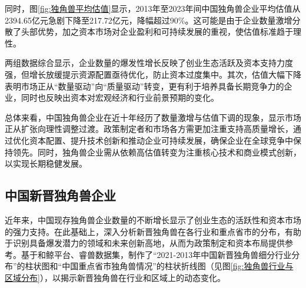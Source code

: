 同时，图\ref{fig:独角兽平均估值}显示，2013年至2023年间中国独角兽企业平均估值从2394.65亿元急剧下降至217.72亿元，降幅超过90\%。这可能是由于企业数量激增分散了头部优势，加之资本市场对企业盈利和可持续发展的重视，使估值标准趋于理性。

两组数据综合显示，企业数量的爆发性增长反映了创业生态活跃及资本支持力度强\cite{Xu2024}，但增长放缓提示资源配置亟待优化，防止资本过度集中。其次，估值大幅下降表明市场正从“数量驱动”向“质量驱动”转变，更有利于培养具备长期竞争力的企业，同时也反映出资本对宏观经济和行业前景预期的变化。

总体来看，中国独角兽企业在近十年经历了数量激增与估值下调的现象，显示市场正从扩张向理性调整过渡。政策制定者和市场各方需更加注重支持高质量增长，通过优化资本配置、提升技术创新和推动企业可持续发展，确保企业在全球竞争中保持领先。同时，独角兽企业需从依赖高估值转变为注重核心技术和商业模式创新，以实现长期稳健发展。

\subsection{中国新晋独角兽企业}

近年来，中国现存独角兽企业数量的不断增长显示了创业生态的活跃性和资本市场的强力支持。在此基础上，深入分析新晋独角兽在各行业和重点省市的分布，有助于识别具备爆发潜力的领域和未来创新高地，从而为政策制定和资本布局提供参考。基于和鲸平台、睿兽数据集，制作了“2021-2013年中国新晋独角兽细分行业分布”的柱状图和“中国重点省市独角兽情况”的柱状折线图（见图\ref{fig:独角兽行业与区域分布}），以揭示新晋独角兽在行业和区域上的动态变化。

